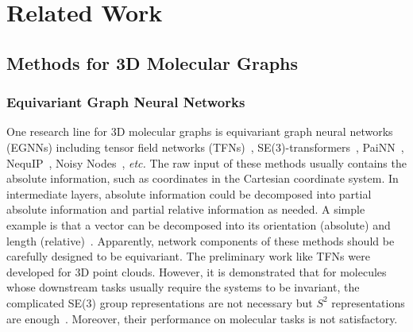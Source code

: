 \documentclass{article}
\begin{document}
\section{Related Work}



\subsection{Methods for 3D Molecular Graphs}  \label{sec:related_3dgn}
\subsubsection{Equivariant Graph Neural Networks}
One research line for 3D molecular graphs is equivariant graph neural networks (EGNNs) including
tensor field networks (TFNs)~\citep{thomas2018tensor},
SE(3)-transformers~\citep{fuchs2020se},
PaiNN~\citep{schutt2021equivariant},
NequIP~\citep{batzner2021se}, Noisy Nodes~\citep{godwin2021very}, \emph{etc.}
\textcolor{COLOR}{The raw input of 
these methods usually contains the absolute information, such as coordinates in the Cartesian coordinate system.
In intermediate layers, absolute information could be decomposed into partial absolute information and partial relative information as needed.
A simple example is that a vector can be decomposed into its orientation (absolute) and length (relative)~\citep{thomas2018tensor,schutt2021equivariant}.
Apparently, network components
of these methods should be carefully designed to be equivariant.}
The preliminary work like TFNs were developed for 3D point clouds.
However, it is demonstrated that for molecules whose downstream tasks usually require
the systems to be invariant, the complicated SE(3) group representations are not necessary but $S^2$ representations are enough~\citep{klicpera2021gemnet}.
Moreover, their performance on molecular tasks is not satisfactory.
\end{document}
